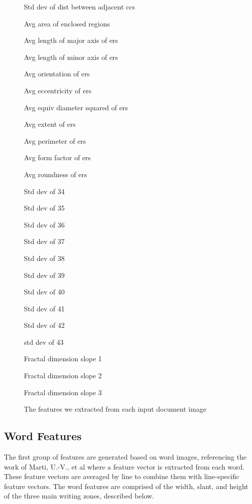 \documentclass[paper=a4, fontsize=11pt]{scrartcl} %
\numberwithin{equation}{section} %
\numberwithin{figure}{section} %
\numberwithin{table}{section} %
\begin{document}
\begin{figure}
\begin{multicols}{3}
\begin{enumerate*}
    \item Std dev of dist between adjacent ccs
    \item Avg area of enclosed regions
    \item Avg length of major axis of ers
    \item Avg length of minor axis of ers
    \item Avg orientation of ers
    \item Avg eccentricity of ers
    \item Avg equiv diameter squared of ers
    \item Avg extent of ers
    \item Avg perimeter of ers
    \item Avg form factor of ers
    \item Avg roundness of ers
    \item Std dev of 34
    \item Std dev of 35
    \item Std dev of 36
    \item Std dev of 37
    \item Std dev of 38
    \item Std dev of 39
    \item Std dev of 40
    \item Std dev of 41
    \item Std dev of 42
    \item std dev of 43
    \item Fractal dimension slope 1
    \item Fractal dimension slope 2
    \item Fractal dimension slope 3
    \end{enumerate*}
  \end{multicols}
  \caption{The features we extracted from each input document image}
  \label{fig:featureList}
\end{figure}

\subsection{Word Features}
The first group of features are generated based on word images,
referencing the work of Marti, U.-V., et al \cite{WriterID} where a
feature vector is extracted from each word. These feature vectors are
averaged by line to combine them with line-specific feature
vectors. The word features are comprised of the width, slant, and height of the three main writing zones, described below. 
\end{document}

